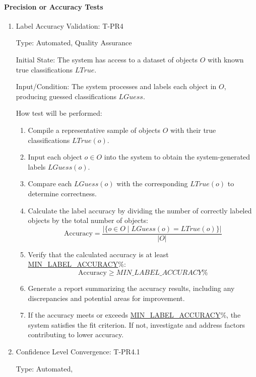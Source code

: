 \documentclass[12pt, titlepage]{article}
\begin{document}
\paragraph{Precision or Accuracy Tests}
\begin{enumerate}

\item{Label Accuracy Validation: T-PR4\\}

Type: Automated, Quality Assurance

Initial State: The system has access to a dataset of objects \( O \) with known true classifications \( LTrue \).

Input/Condition: The system processes and labels each object in \( O \), producing guessed classifications \( LGuess \).

How test will be performed:
\begin{enumerate}
    \item Compile a representative sample of objects \( O \) with their true classifications \( LTrue(o) \).
    \item Input each object \( o \in O \) into the system to obtain the system-generated labels \( LGuess(o) \).
    \item Compare each \( LGuess(o) \) with the corresponding \( LTrue(o) \) to determine correctness.
    \item Calculate the label accuracy by dividing the number of correctly labeled objects by the total number of objects:
    \[
    \text{Accuracy} = \frac{|\{ o \in O \mid LGuess(o) = LTrue(o) \}|}{|O|}
    \]
    \item Verify that the calculated accuracy is at least \hyperref[MIN_LABEL_ACCURACY]{MIN\_LABEL\_ACCURACY}\%:
    \[
    \text{Accuracy} \geq \hyperref[MIN_LABEL_ACCURACY]{MIN\_LABEL\_ACCURACY}\%
    \]
    \item Generate a report summarizing the accuracy results, including any discrepancies and potential areas for improvement.
    \item If the accuracy meets or exceeds \hyperref[MIN_LABEL_ACCURACY]{MIN\_LABEL\_ACCURACY}\%, the system satisfies the fit criterion. If not, investigate and address factors contributing to lower accuracy.
\end{enumerate}

\item{Confidence Level Convergence: T-PR4.1\\}

Type: Automated, 


\end{enumerate}
\end{document}
